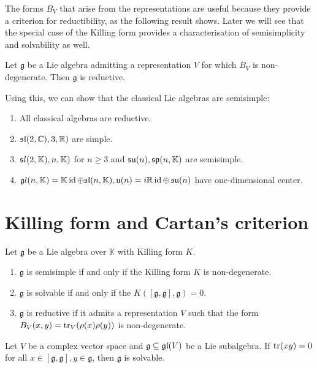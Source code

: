 \documentclass{report}
\begin{document}
The forms $B_V$ that arise from the representations are useful because they provide a criterion for reductibility, as the following result shows.
Later we will see that the special case of the Killing form provides a characterisation of semisimplicity and solvability as well.
\begin{proposition}
    Let $\mathfrak g$ be a Lie algebra admitting a representation $V$ for which $B_V$ is non-degenerate.
    Then $\mathfrak g$ is reductive.
\end{proposition}
Using this, we can show that the classical Lie algebras are semisimple:
\begin{theorem}
    \begin{enumerate}[label = (\roman*)]
        \item All classical algebras are reductive.
        \item $\ssl(2, \mathbb C), \so(3,\mathbb R)$ are simple.
        \item $\mathfrak sl(2, \mathbb K), \so(n, \mathbb K)$ for $n \geq 3$ and $\operatorname{{\mathfrak{su}}}(n), \mathfrak{sp}(n, \mathbb K)$ are semisimple.
        \item $\mathfrak gl(n, \mathbb K) = \mathbb K \operatorname{id} \oplus \mathfrak{sl}(n, \mathbb K), \mathfrak{u}(n) = i \mathbb R \operatorname{id} \oplus \operatorname{{\mathfrak{su}}}(n)$ have one-dimensional center. 
    \end{enumerate}
\end{theorem}

\section{Killing form and Cartan's criterion}
\begin{theorem}
    Let $\mathfrak g$ be a Lie algebra over $\mathbb K$ with Killing form $K$.
    \begin{enumerate}[label = (\roman*)]
        \item $\mathfrak g$ is semisimple if and only if the Killing form $K$ is non-degenerate.
        \item $\mathfrak g$ is solvable if and only if the $K([\mathfrak g, \mathfrak g], \mathfrak g) = 0$.
        \item $\mathfrak g$ is reductive if it admits a representation $V$ such that the form $B_V(x,y) = \operatorname{tr}_V(\rho(x) \rho(y))$ is non-degenerate.
    \end{enumerate}    
\end{theorem}
\begin{lemma}
    Let $V$ be a complex vector space and $\mathfrak g \subseteq \operatorname{{\mathfrak{gl}}}(V)$ be a Lie subalgebra.
    If $\operatorname{tr}(xy) = 0$ for all $x \in [\mathfrak g, \mathfrak g], y \in \mathfrak g$, then $\mathfrak g$ is solvable.
\end{lemma}
\end{document}
